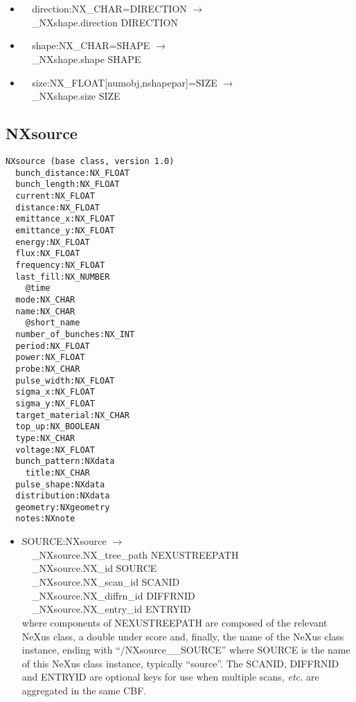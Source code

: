 \documentclass[11pt]{article}
\begin{document}
{{\begin{itemize}
\item{\verb|  |direction:NX\_CHAR=DIRECTION $\rightarrow$\\
\verb|  |\_NXshape.direction DIRECTION}

\item{\verb|  |shape:NX\_CHAR=SHAPE $\rightarrow$\\
\verb|  |\_NXshape.shape SHAPE}

\item{\verb|  |size:NX\_FLOAT[numobj,nshapepar]=SIZE $\rightarrow$\\
\verb|  |\_NXshape.size SIZE}
\end{itemize}
\subsection{NXsource}

\begin{verbatim}
NXsource (base class, version 1.0)
  bunch_distance:NX_FLOAT
  bunch_length:NX_FLOAT
  current:NX_FLOAT
  distance:NX_FLOAT
  emittance_x:NX_FLOAT
  emittance_y:NX_FLOAT
  energy:NX_FLOAT
  flux:NX_FLOAT
  frequency:NX_FLOAT
  last_fill:NX_NUMBER
    @time
  mode:NX_CHAR
  name:NX_CHAR
    @short_name
  number_of_bunches:NX_INT
  period:NX_FLOAT
  power:NX_FLOAT
  probe:NX_CHAR
  pulse_width:NX_FLOAT
  sigma_x:NX_FLOAT
  sigma_y:NX_FLOAT
  target_material:NX_CHAR
  top_up:NX_BOOLEAN
  type:NX_CHAR
  voltage:NX_FLOAT
  bunch_pattern:NXdata
    title:NX_CHAR
  pulse_shape:NXdata
  distribution:NXdata
  geometry:NXgeometry
  notes:NXnote
\end{verbatim}

\begin{itemize}

\item{SOURCE:NXsource $\rightarrow$\\
\verb|  |\_NXsource.NX\_tree\_path    NEXUSTREEPATH \\
\verb|  |\_NXsource.NX\_id            SOURCE\\
\verb|  |\_NXsource.NX\_scan\_id      SCANID \\
\verb|  |\_NXsource.NX\_diffrn\_id    DIFFRNID \\
\verb|  |\_NXsource.NX\_entry\_id     ENTRYID \\
where components of NEXUSTREEPATH are composed of the
relevant NeXus class, a double under score and, finally, the
name of the NeXus class instance, ending with ``/NXsource\_\_SOURCE''
where SOURCE is the name of this NeXus class instance, typically ``source''.
The SCANID, DIFFRNID and ENTRYID are optional keys for use
when multiple scans, {\it etc.} are aggregated in the same CBF.}


\end{itemize}}}
\end{document}
